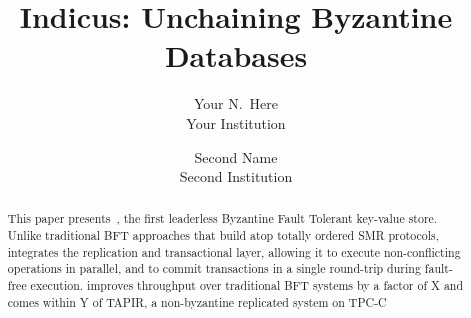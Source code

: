 \documentclass[letterpaper,twocolumn,10pt]{article}
\begin{document}

\date{}

\title{\Large \bf Indicus: Unchaining Byzantine Databases\\
 }

\author{
{\rm Your N.\ Here}\\
Your Institution
\and
{\rm Second Name}\\
Second Institution
} %

\maketitle

\begin{abstract}
\vspace{0.5em}
   This paper presents~\sys{}, the first leaderless Byzantine Fault Tolerant
    key-value store. Unlike traditional BFT approaches that build atop totally ordered SMR protocols,
    \sys{} integrates the replication and transactional layer, allowing it to execute non-conflicting
    operations in parallel, and to commit transactions in a single round-trip during fault-free execution.
    \sys{} improves throughput over traditional BFT systems by a factor of X and comes within Y of TAPIR, a non-byzantine
    replicated system on TPC-C

\iffalse    
This paper presents \sys{}, the first leaderless Byzantine Fault Tolerant (BFT) key-value store that provides ACID transactions. Unlike traditional BFT approaches that build atop totally ordered SMR protocols, \sys integrates replication and transaction layer, allowing it to commit transactions within a single roundtrip in fault-free execution. By allowing clients to execute and drive consensus instances for their own transactions in parallel, \sys enables commutative transactions to complete independently while limiting the influence of Byzantine behavior on results. 
    This design, coupled with an aggressive concurrency control mechanism to maintain Isolation correctness, allows \sys to reasonably compete within non-BFT tolerant transaction systems, while outperforming SMR-based BFT solutions: For the TPC-C OLTP workload \sys{}'s throughput and latency comes within Yx and Zx respectively when compared to Tapir, a state-of-the-art non-BFT key-value store; but improves over a total-order inducing BFT baseline by Sx and Tx respectively.
\fi
\end{abstract}
\end{document}
